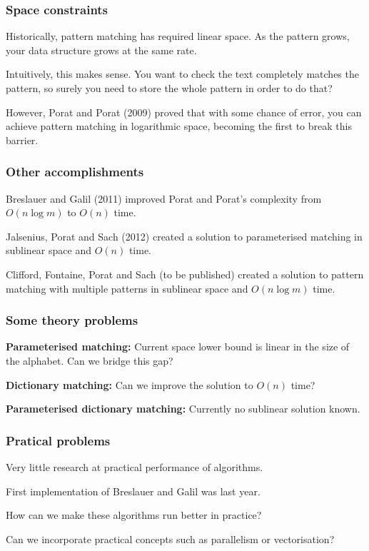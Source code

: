 \documentclass{beamer}
\begin{document}

\begin{frame}
\frametitle{Space constraints}
Historically, pattern matching has required linear space. As the pattern grows, your data structure grows at the same rate.

Intuitively, this makes sense. You want to check the text completely matches the pattern, so surely you need to store the whole pattern in order to do that?

However, Porat and Porat (2009) proved that with some chance of error, you can achieve pattern matching in logarithmic space, becoming the first to break this barrier.
\end{frame}


\begin{frame}
\frametitle{Other accomplishments}
Breslauer and Galil (2011) improved Porat and Porat's complexity from $O(n\log m)$ to $O(n)$ time.

Jalsenius, Porat and Sach (2012) created a solution to parameterised matching in sublinear space and $O(n)$ time.

Clifford, Fontaine, Porat and Sach (to be published) created a solution to pattern matching with multiple patterns in sublinear space and $O(n\log m)$ time.
\end{frame}


\begin{frame}
\frametitle{Some theory problems}
\textbf{Parameterised matching:} Current space lower bound is linear in the size of the alphabet. Can we bridge this gap?

\textbf{Dictionary matching:} Can we improve the solution to $O(n)$ time?

\textbf{Parameterised dictionary matching:} Currently no sublinear solution known.
\end{frame}


\begin{frame}
\frametitle{Pratical problems}
Very little research at practical performance of algorithms.

First implementation of Breslauer and Galil was last year.

How can we make these algorithms run better in practice?

Can we incorporate practical concepts such as parallelism or vectorisation?
\end{frame}
\end{document}
